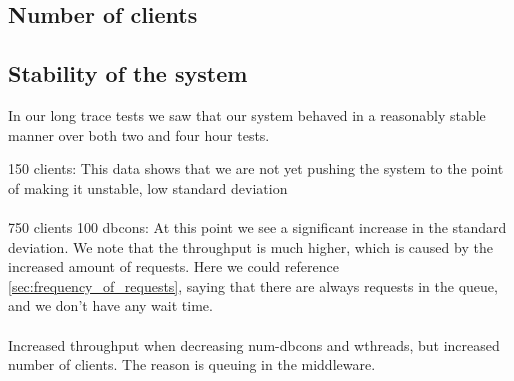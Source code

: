 \documentclass{article}
\begin{document}
\begin{table}
\begin{tabular}
        \subsection{Number of clients}


        \subsection{Stability of the system}
            In our long trace tests we saw that our system behaved in a reasonably stable manner over both two and four hour tests.

            150 clients: This data shows that we are not yet pushing the system to the point of making it unstable, low standard deviation\\
            \\
            750 clients 100 dbcons: At this point we see a significant increase in the standard deviation. We note that the throughput is much higher, which is caused by the increased amount of requests. Here we could reference \ref{sec:frequency_of_requests}, saying that there are always requests in the queue, and we don't have any wait time.\\
            \\
            Increased throughput when decreasing num-dbcons and wthreads, but increased number of clients. The reason is queuing in the middleware.


\end{tabular}
\end{table}
\end{document}

